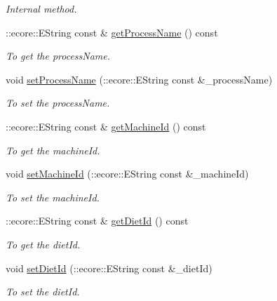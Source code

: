 \begin{DoxyCompactItemize}
\begin{DoxyCompactList}\small\item\em Internal method. \item\end{DoxyCompactList}\item 
::ecore::EString const \& \hyperlink{classIMS__Data_1_1Process_a06799a1d3ed34e8bff6daa05adec2484}{getProcessName} () const 
\begin{DoxyCompactList}\small\item\em To get the processName. \item\end{DoxyCompactList}\item 
void \hyperlink{classIMS__Data_1_1Process_a4dc67dc1ec05da3e96a7e745b705ea04}{setProcessName} (::ecore::EString const \&\_\-processName)
\begin{DoxyCompactList}\small\item\em To set the processName. \item\end{DoxyCompactList}\item 
::ecore::EString const \& \hyperlink{classIMS__Data_1_1Process_ad1b0f34174212de9152e77e30768d824}{getMachineId} () const 
\begin{DoxyCompactList}\small\item\em To get the machineId. \item\end{DoxyCompactList}\item 
void \hyperlink{classIMS__Data_1_1Process_a6236a30eed29be927e17fdb8b76ed56e}{setMachineId} (::ecore::EString const \&\_\-machineId)
\begin{DoxyCompactList}\small\item\em To set the machineId. \item\end{DoxyCompactList}\item 
::ecore::EString const \& \hyperlink{classIMS__Data_1_1Process_a65a65218756d7f5639d10dc0819f36d9}{getDietId} () const 
\begin{DoxyCompactList}\small\item\em To get the dietId. \item\end{DoxyCompactList}\item 
void \hyperlink{classIMS__Data_1_1Process_a54b3ee37568467d1918f9667b9afa5e3}{setDietId} (::ecore::EString const \&\_\-dietId)
\begin{DoxyCompactList}\small\item\em To set the dietId. \item\end{DoxyCompactList}\item 

\end{DoxyCompactItemize}
